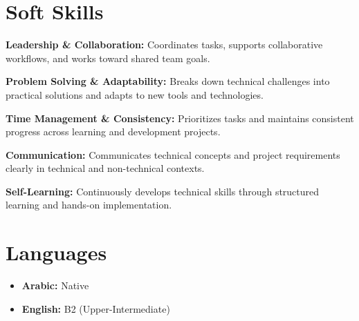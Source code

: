 \documentclass[letterpaper,11pt]{article}
\begin{document}
\section{Soft Skills}
\begin{itemize}[leftmargin=0.15in, label={}]
  \small{
    \item{\textbf{Leadership \& Collaboration:}
    Coordinates tasks, supports collaborative workflows, and works
    toward shared team goals.}

    \item{\textbf{Problem Solving \& Adaptability:}
    Breaks down technical challenges into practical solutions and
    adapts to new tools and technologies.}

    \item{\textbf{Time Management \& Consistency:}
    Prioritizes tasks and maintains consistent progress across
    learning and development projects.}

    \item{\textbf{Communication:}
    Communicates technical concepts and project requirements
    clearly in technical and non-technical contexts.}

    \item{\textbf{Self-Learning:}
    Continuously develops technical skills through structured
    learning and hands-on implementation.}
  }
\end{itemize}


\section{Languages}
\begin{itemize}[leftmargin=0.15in, label={}]
  \item \textbf{Arabic:} Native
  \item \textbf{English:} B2 (Upper-Intermediate)
\end{itemize}

\vspace{-16pt}
\end{document}
